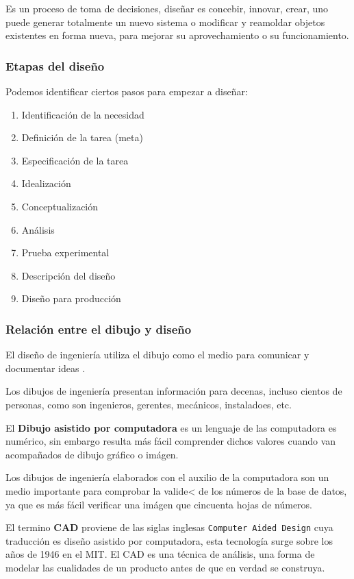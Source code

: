 \begin{definition}
  Es un proceso de toma de decisiones, diseñar es concebir, innovar, crear, uno puede generar totalmente un nuevo sistema o modificar y reamoldar objetos existentes en forma nueva, para mejorar su aprovechamiento o su funcionamiento.
\end{definition}

\subsubsection{Etapas del diseño}
Podemos identificar ciertos pasos para empezar a diseñar:
\begin{enumerate}
  \item Identificación de la necesidad
  \item Definición de la tarea (meta)
  \item Especificación de la tarea
  \item Idealización
  \item Conceptualización
  \item Análisis
  \item Prueba experimental
  \item Descripción del diseño
  \item Diseño para producción
\end{enumerate}

\subsubsection{Relación entre el dibujo y diseño}

El diseño de ingeniería utiliza el dibujo como el medio para comunicar y documentar ideas \autocite{li2012gamicad}.

Los dibujos de ingeniería presentan información para decenas, incluso cientos de personas, como son ingenieros, gerentes, mecánicos, instaladoes, etc.

El \textbf{Dibujo asistido por computadora} es un lenguaje de las computadora es numérico, sin embargo resulta más fácil comprender dichos valores cuando van acompañados de dibujo gráfico o imágen.

Los dibujos de ingeniería elaborados con el auxilio de la computadora son un medio importante para comprobar la valide< de los números de la base de datos, ya que es más fácil verificar una imágen que cincuenta hojas de números.

El termino \textbf{CAD} proviene de las siglas inglesas \texttt{Computer Aided Design} cuya traducción es diseño asistido por computadora, esta tecnología surge sobre los años de 1946 en el MIT.
El CAD es una técnica de análisis, una forma de modelar las cualidades de un producto antes de que en verdad se construya.

